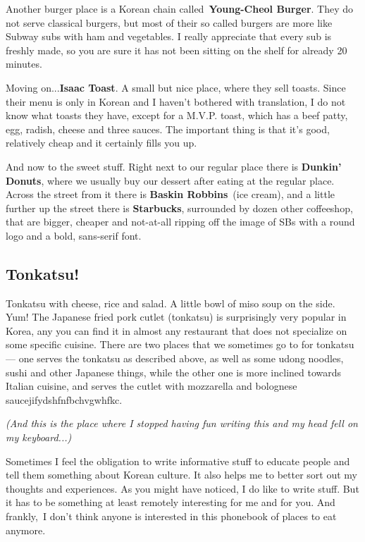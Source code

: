 \begin{post}
\begin{content}
Another burger place is a Korean chain called \textbf{Young-Cheol Burger}. They do not serve classical burgers, but most of their so called burgers are more like Subway subs with ham and vegetables. I really appreciate that every sub is freshly made, so you are sure it has not been sitting on the shelf for already 20 minutes.

Moving on...\textbf{Isaac Toast}. A small but nice place, where they sell toasts. Since their menu is only in Korean and I haven't bothered with translation, I do not know what toasts they have, except for a M.V.P. toast, which has a beef patty, egg, radish, cheese and three sauces. The important thing is that it's good, relatively cheap and it certainly fills you up.

And now to the sweet stuff. Right next to our regular place there is \textbf{Dunkin' Donuts}, where we usually buy our dessert after eating at the regular place. Across the street from it there is \textbf{Baskin Robbins} (ice cream), and a little further up the street there is \textbf{Starbucks}, surrounded by dozen other coffeeshop, that are bigger, cheaper and not-at-all ripping off the image of SBs with a round logo and a bold, sans-serif font.

\subsection{Tonkatsu!}
Tonkatsu with cheese, rice and salad. A little bowl of miso soup on the side. Yum! The Japanese fried pork cutlet (tonkatsu) is surprisingly very popular in Korea, any you can find it in almost any restaurant that does not specialize on some specific cuisine. There are two places that we sometimes go to for tonkatsu — one serves the tonkatsu as described above, as well as some udong noodles, sushi and other Japanese things, while the other one is more inclined towards Italian cuisine, and serves the cutlet with mozzarella and bolognese saucejifydshfnfbchvgwhfkc.

\textit{(And this is the place where I stopped having fun writing this and my head fell on my keyboard...)}

Sometimes I feel the obligation to write informative stuff to educate people and tell them something about Korean culture. It also helps me to better sort out my thoughts and experiences. As you might have noticed, I do like to write stuff. But it has to be something at least remotely interesting for me and for you. And frankly, I don't think anyone is interested in this phonebook of places to eat anymore.


\end{content}
\end{post}
